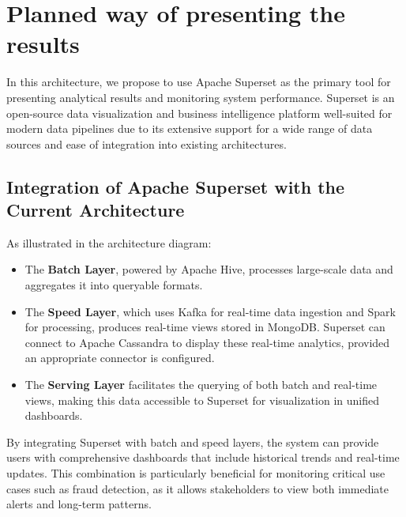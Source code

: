 \documentclass[12pt,a4paper, hidelinks]{article}
\begin{document}
\section{Planned way of presenting the results}

In this architecture, we propose to use Apache Superset as the primary tool for presenting analytical results and monitoring system performance. Superset is an open-source data visualization and business intelligence platform well-suited for modern data pipelines due to its extensive support for a wide range of data sources and ease of integration into existing architectures.

\subsection{Integration of Apache Superset with the Current Architecture}
As illustrated in the architecture diagram:
\begin{itemize}
    \item The \textbf{Batch Layer}, powered by Apache Hive, processes large-scale data and aggregates it into queryable formats.
    \item The \textbf{Speed Layer}, which uses Kafka for real-time data ingestion and Spark for processing, produces real-time views stored in MongoDB. Superset can connect to Apache Cassandra to display these real-time analytics, provided an appropriate connector is configured.
    \item The \textbf{Serving Layer} facilitates the querying of both batch and real-time views, making this data accessible to Superset for visualization in unified dashboards.
\end{itemize}

By integrating Superset with batch and speed layers, the system can provide users with comprehensive dashboards that include historical trends and real-time updates. This combination is particularly beneficial for monitoring critical use cases such as fraud detection, as it allows stakeholders to view both immediate alerts and long-term patterns.
\end{document}

